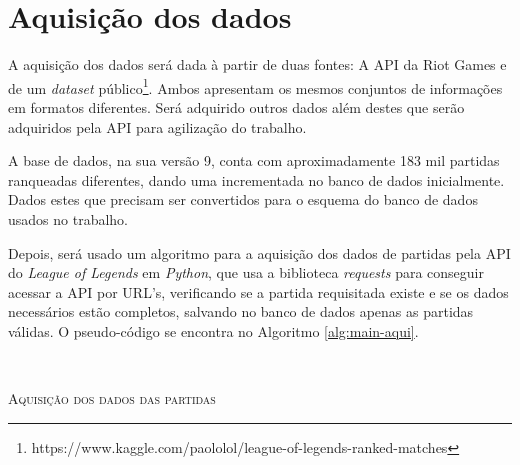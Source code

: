 \section{Aquisição dos dados}
\label{chap:aquisicao}
A aquisição dos dados será dada à partir de duas fontes: A API da Riot Games e de um \textit{dataset} público\footnote{https://www.kaggle.com/paololol/league-of-legends-ranked-matches}. Ambos apresentam os mesmos conjuntos de informações em formatos diferentes. Será adquirido outros dados além destes que serão adquiridos pela API para agilização do trabalho.

A base de dados, na sua versão 9, conta com aproximadamente 183 mil partidas ranqueadas diferentes, dando uma incrementada no banco de dados inicialmente. Dados estes que precisam ser convertidos para o esquema do banco de dados usados no trabalho.

Depois, será usado um algoritmo para a aquisição dos dados de partidas pela API do \textit{League of Legends} em \textit{Python}, que usa a biblioteca \textit{requests} para conseguir acessar a API por URL's, verificando se a partida requisitada existe e se os dados necessários estão completos, salvando no banco de dados apenas as partidas válidas. O pseudo-código se encontra no Algoritmo \ref{alg:main-aqui}.

\


\begin{algorithm}[H]
   \SetAlgoLined
   \label{alg:main-aqui}
   \caption{\textsc{Aquisição dos dados das partidas}}
 \end{algorithm}

